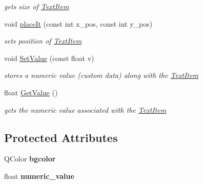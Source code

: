 \begin{DoxyCompactItemize}
\begin{DoxyCompactList}\small\item\em gets size of \hyperlink{class_text_item}{Text\+Item} \end{DoxyCompactList}\item 
void \hyperlink{class_text_item_ac0971ebbb2d234e7da58acbf11ba4a60}{place\+It} (const int x\+\_\+pos, const int y\+\_\+pos)
\begin{DoxyCompactList}\small\item\em sets position of \hyperlink{class_text_item}{Text\+Item} \end{DoxyCompactList}\item 
void \hyperlink{class_text_item_a785f645633f00591d7a33d7f54f72705}{Set\+Value} (const float v)
\begin{DoxyCompactList}\small\item\em stores a numeric value (custom data) along with the \hyperlink{class_text_item}{Text\+Item} \end{DoxyCompactList}\item 
float \hyperlink{class_text_item_ad1824d69e26bd8d7414c1ab6f9a7ed12}{Get\+Value} ()
\begin{DoxyCompactList}\small\item\em gets the numeric value associated with the \hyperlink{class_text_item}{Text\+Item} \end{DoxyCompactList}\end{DoxyCompactItemize}
\subsection*{Protected Attributes}
\begin{DoxyCompactItemize}
\item 
Q\+Color {\bfseries bgcolor}\hypertarget{class_text_item_ad04d01ec588c0c9afa52719cd57cee9e}{}\label{class_text_item_ad04d01ec588c0c9afa52719cd57cee9e}

\item 
float {\bfseries numeric\+\_\+value}\hypertarget{class_text_item_a2310d84d779d095293e504e5c6e2d5ee}{}\label{class_text_item_a2310d84d779d095293e504e5c6e2d5ee}

\end{DoxyCompactItemize}
